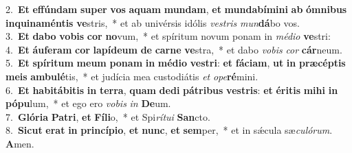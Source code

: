 {2.~}\textbf{Et} \textbf{ef}\textbf{fún}\textbf{dam} \textbf{su}\textbf{per} \textbf{vos} \textbf{a}\textbf{quam} \textbf{mun}\textbf{dam}, \textbf{et} \textbf{mun}\textbf{da}\textbf{bí}\textbf{mi}\textbf{ni} \textbf{ab} \textbf{óm}\textbf{ni}\textbf{bus} \textbf{in}\textbf{qui}\textbf{na}\textbf{mén}\textbf{tis} \textbf{ve}stris,~* et ab univérsis idólis \textit{ve}\textit{stris} \textit{mun}\textbf{dá}bo vos.\\
{3.~}\textbf{Et} \textbf{da}\textbf{bo} \textbf{vo}\textbf{bis} \textbf{cor} \textbf{no}vum,~* et spíritum novum ponam in \textit{mé}\textit{di}\textit{o} \textbf{ve}stri:\\
{4.~}\textbf{Et} \textbf{áu}\textbf{fe}\textbf{ram} \textbf{cor} \textbf{la}\textbf{pí}\textbf{de}\textbf{um} \textbf{de} \textbf{car}\textbf{ne} \textbf{ve}stra,~* et dabo \textit{vo}\textit{bis} \textit{cor} \textbf{cár}neum.\\
{5.~}\textbf{Et} \textbf{spí}\textbf{ri}\textbf{tum} \textbf{me}\textbf{um} \textbf{po}\textbf{nam} \textbf{in} \textbf{mé}\textbf{di}\textbf{o} \textbf{ve}\textbf{stri}: \textbf{et} \textbf{fá}\textbf{ci}\textbf{am}, \textbf{ut} \textbf{in} \textbf{præ}\textbf{cép}\textbf{tis} \textbf{me}\textbf{is} \textbf{am}\textbf{bu}\textbf{lé}tis,~* et judícia mea custodiátis \textit{et} \textit{o}\textit{pe}\textbf{ré}mini.\\
{6.~}\textbf{Et} \textbf{ha}\textbf{bi}\textbf{tá}\textbf{bi}\textbf{tis} \textbf{in} \textbf{ter}\textbf{ra}, \textbf{quam} \textbf{de}\textbf{di} \textbf{pá}\textbf{tri}\textbf{bus} \textbf{ve}\textbf{stris}: \textbf{et} \textbf{é}\textbf{ri}\textbf{tis} \textbf{mi}\textbf{hi} \textbf{in} \textbf{pó}\textbf{pu}lum,~* et ego ero \textit{vo}\textit{bis} \textit{in} \textbf{De}um.\\
{7.~}\textbf{Gló}\textbf{ri}\textbf{a} \textbf{Pa}\textbf{tri}, \textbf{et} \textbf{Fí}\textbf{li}o,~* et Spi\textit{rí}\textit{tu}\textit{i} \textbf{San}cto.\\
{8.~}\textbf{Si}\textbf{cut} \textbf{e}\textbf{rat} \textbf{in} \textbf{prin}\textbf{cí}\textbf{pi}\textbf{o}, \textbf{et} \textbf{nunc}, \textbf{et} \textbf{sem}per,~* et in sǽcula sæ\textit{cu}\textit{ló}\textit{rum}. \textbf{A}men.\\
